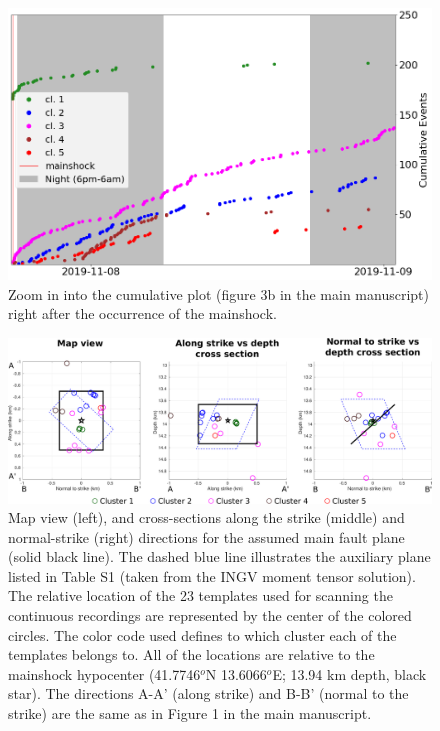 \documentclass[a4paper,12pt]{article}
\begin{document}
\begin{figure}[!h]
\renewcommand{\thefigure}{S\arabic{figure}}
\begin{center}
 \includegraphics[width=0.8\linewidth]{S4_cumulative_per_cluster_zoom.png} 
\end{center}
\caption{Zoom in into the cumulative plot (figure 3b in the main manuscript) right after the occurrence of the mainshock.}
\label{fig:S4_fig3_zoom}
\end{figure}


\begin{figure}[!h]
\renewcommand{\thefigure}{S\arabic{figure}}
\begin{center}
 \includegraphics[width=1\linewidth]{S6_templates_per_cluster_map.pdf} 
\end{center}
\caption{Map view (left), and cross-sections along the strike (middle) and normal-strike (right) directions for the assumed main fault plane (solid black line). The dashed blue line illustrates the auxiliary plane listed in Table S1 (taken from the INGV moment tensor solution). The relative location of the 23 templates used for scanning the continuous recordings are represented by the center of the colored circles. The color code used defines to which cluster each of the templates belongs to. All of the locations are relative to the mainshock hypocenter (41.7746$^o$N 13.6066$^o$E; 13.94 km depth, black star). The directions A-A' (along strike) and B-B' (normal to the strike) are the same as in Figure 1 in the main manuscript.}
\label{fig:S6_templates_map}
\end{figure}
\end{document}
